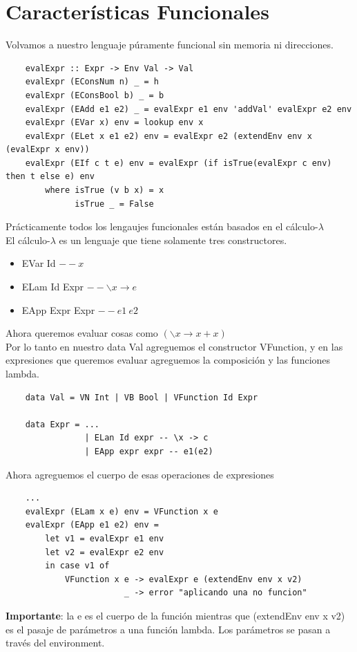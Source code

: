 \documentclass[10pt,a4paper]{article}
\begin{document}
\section*{Características Funcionales}
Volvamos a nuestro lenguaje púramente funcional sin memoria ni direcciones. \\
\begin{lstlisting}
    evalExpr :: Expr -> Env Val -> Val
    evalExpr (EConsNum n) _ = h 
    evalExpr (EConsBool b) _ = b
    evalExpr (EAdd e1 e2) _ = evalExpr e1 env 'addVal' evalExpr e2 env
    evalExpr (EVar x) env = lookup env x 
    evalExpr (ELet x e1 e2) env = evalExpr e2 (extendEnv env x (evalExpr x env))
    evalExpr (EIf c t e) env = evalExpr (if isTrue(evalExpr c env) then t else e) env 
        where isTrue (v b x) = x
              isTrue _ = False 
\end{lstlisting}
Prácticamente todos los lengaujes funcionales están basados en el cálculo-$\lambda$ \\
El cálculo-$\lambda$ es un lenguaje que tiene solamente tres constructores. 
\begin{itemize}
    \item EVar Id $ -- x$
    \item ELam Id Expr $-- \backslash x \rightarrow e $
    \item EApp Expr Expr $-- e1 \ e2$
\end{itemize}
Ahora queremos evaluar cosas como $(\backslash x \rightarrow x + x)$ \\
Por lo tanto en nuestro data Val agreguemos el constructor VFunction, y en las expresiones que queremos evaluar agreguemos la composición y las funciones lambda. \\
\begin{lstlisting}
    data Val = VN Int | VB Bool | VFunction Id Expr 

    data Expr = ... 
                | ELan Id expr -- \x -> c 
                | EApp expr expr -- e1(e2)
\end{lstlisting}
Ahora agreguemos el cuerpo de esas operaciones de expresiones 
\begin{lstlisting}
    ...
    evalExpr (ELam x e) env = VFunction x e 
    evalExpr (EApp e1 e2) env = 
        let v1 = evalExpr e1 env 
        let v2 = evalExpr e2 env 
        in case v1 of 
            VFunction x e -> evalExpr e (extendEnv env x v2)
                        _ -> error "aplicando una no funcion"
\end{lstlisting}
\textbf{Importante}: la e es el cuerpo de la función mientras que (extendEnv env x v2) es el pasaje de parámetros a una función lambda. Los parámetros se pasan a través del environment. \\
\end{document}
